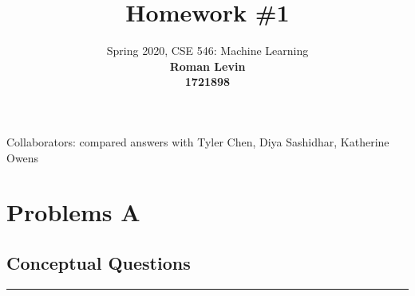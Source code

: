 \documentclass{article}
\date{{}}
\newcommand{\1}{\mathbf{1}}
\begin{document}
\title{Homework \#1}
\author{\normalsize{Spring 2020, CSE 546: Machine Learning}\\
\normalsize{\bf Roman Levin} \\
\normalsize{\bf 1721898} \\
}
\maketitle
Collaborators: compared answers with Tyler Chen, Diya Sashidhar, Katherine Owens
\section*{Problems A}
\subsection*{Conceptual Questions}
\noindent\rule{\textwidth}{1pt}
\end{document}
